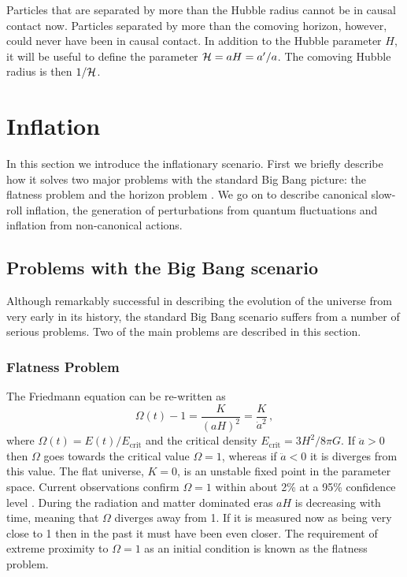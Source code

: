 Particles
that are separated by more than the Hubble radius cannot be in causal
contact now. Particles separated by more than the
comoving horizon, however, could never have been in causal contact. In addition
to the Hubble parameter $H$, it will be useful
to define the parameter $\mathcal{H} = aH = a'/a$. The comoving Hubble radius is then
$1/\mathcal{H}$.







\section{Inflation}
\label{sec:inflation-intro}
In this section we introduce the inflationary scenario. First we briefly
describe how it solves two major problems with the standard Big Bang
picture: the flatness problem and the horizon problem \cite{book:liddle}. We go on to
describe canonical slow-roll inflation, the generation of
perturbations from quantum fluctuations and inflation from non-canonical
actions.

\subsection{Problems with the Big Bang scenario}
Although remarkably successful in describing the evolution of the universe from
very early in its history, the standard Big Bang scenario suffers from a number
of serious problems. Two of the main problems are described in this section.

\subsubsection{Flatness Problem} 
\label{sec:flatprob}
The Friedmann equation
 can be re-written as
% 
\begin{equation}
\label{eq:omegadefn-intro}
\Omega(t) - 1 = \frac{K}{(aH)^2} = \frac{K}{\dot{a}^2} \,,
\end{equation}
% 
where $\Omega(t)=E(t)/E_\mathrm{crit}$ and the critical density
$E_\mathrm{crit}= 3H^2/8\pi G$. 
If $\ddot{a}>0$ then $\Omega$ goes towards the critical value $\Omega=1$, whereas if
$\ddot{a}<0$ it is diverges from this value. The flat universe, $K=0$,
is an unstable fixed point in the parameter space.
Current observations confirm $\Omega=1$ within about 2\% at a 95\% confidence
level \cite{Komatsu:2008hk}.
During the radiation and matter dominated eras $aH$ is decreasing with time,
meaning that $\Omega$ diverges away from 1. If it is measured now as being very
close to 1 then in the past it must have been even closer. The requirement of
extreme proximity to $\Omega=1$ as an initial condition is known as the
flatness problem. 


